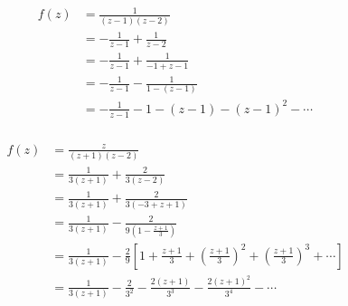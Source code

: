 \documentclass{article}
\begin{document}
\setcounter{subsubsection}{14}
\subsubsection{}

\begin{align*}
  f(z) & = \frac{1}{(z - 1) (z - 2)}                           \\
       & = -\frac{1}{z - 1} + \frac{1}{z - 2}                  \\
       & = -\frac{1}{z - 1} + \frac{1}{-1 + z - 1}             \\
       & = -\frac{1}{z - 1} - \frac{1}{1 - (z - 1)}            \\
       & = -\frac{1}{z - 1} - 1 - (z - 1) - (z - 1)^2 - \cdots
\end{align*}

\setcounter{subsubsection}{16}
\subsubsection{}

\begin{align*}
  f(z) & = \frac{z}{(z + 1) (z - 2)}                                                                                                                           \\
       & = \frac{1}{3 (z + 1)} + \frac{2}{3 (z - 2)}                                                                                                           \\
       & = \frac{1}{3 (z + 1)} + \frac{2}{3 (-3 + z + 1)}                                                                                                      \\
       & = \frac{1}{3 (z + 1)} - \frac{2}{9 \left( 1 - \frac{z + 1}{3} \right)}                                                                                \\
       & = \frac{1}{3 (z + 1)} - \frac{2}{9} \left[ 1 + \frac{z + 1}{3} + \left( \frac{z + 1}{3} \right)^2 + \left( \frac{z + 1}{3} \right)^3 + \cdots \right] \\
       & = \frac{1}{3 (z + 1)} - \frac{2}{3^2} - \frac{2 (z + 1)}{3^3} - \frac{2 (z + 1)^2}{3^4} - \cdots
\end{align*}

\setcounter{subsubsection}{18}
\subsubsection{}
\end{document}
